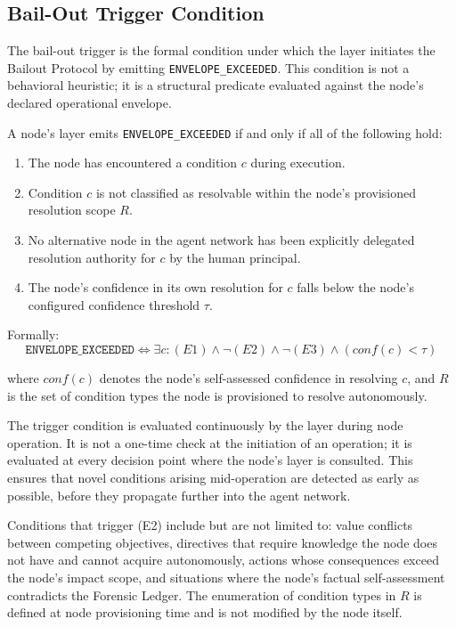 \subsection{Bail-Out Trigger Condition}
\label{sec:trigger}

The bail-out trigger is the formal condition under which the \bounds{} layer initiates the Bailout Protocol by emitting \texttt{ENVELOPE\_EXCEEDED}. This condition is not a behavioral heuristic; it is a structural predicate evaluated against the node's declared operational envelope.

\begin{definition}
\label{def:envelope-exceedance}
A node's \bounds{} layer emits \texttt{ENVELOPE\_EXCEEDED} if and only if all of the following hold:

\begin{enumerate}
\item[(E1)] The node has encountered a condition $c$ during execution.
\item[(E2)] Condition $c$ is not classified as resolvable within the node's provisioned resolution scope $R$.
\item[(E3)] No alternative node in the agent network has been explicitly delegated resolution authority for $c$ by the human principal.
\item[(E4)] The node's confidence in its own resolution for $c$ falls below the node's configured confidence threshold $\tau$.
\end{enumerate}

Formally:
\[
\texttt{ENVELOPE\_EXCEEDED} \iff \exists c \colon (E1) \land \neg(E2) \land \neg(E3) \land (conf(c) < \tau)
\]

where $conf(c)$ denotes the node's self-assessed confidence in resolving $c$, and $R$ is the set of condition types the node is provisioned to resolve autonomously.
\end{definition}

The trigger condition is evaluated continuously by the \bounds{} layer during node operation. It is not a one-time check at the initiation of an operation; it is evaluated at every decision point where the node's \bounds{} layer is consulted. This ensures that novel conditions arising mid-operation are detected as early as possible, before they propagate further into the agent network.

Conditions that trigger (E2) include but are not limited to: value conflicts between competing objectives, directives that require knowledge the node does not have and cannot acquire autonomously, actions whose consequences exceed the node's impact scope, and situations where the node's factual self-assessment contradicts the Forensic Ledger. The enumeration of condition types in $R$ is defined at node provisioning time and is not modified by the node itself.

